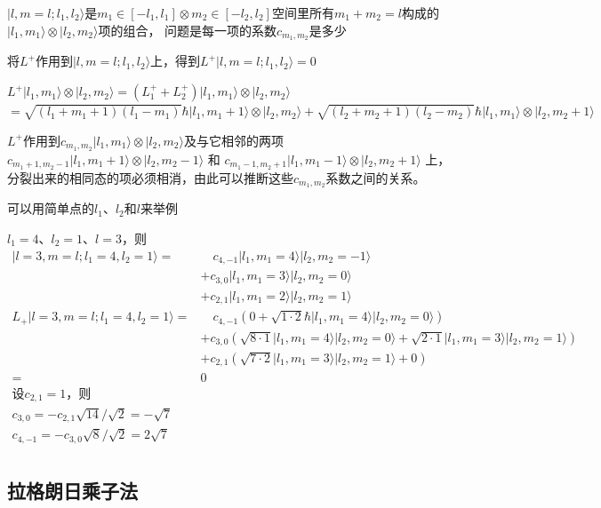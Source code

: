 $|l,m=l;l_1,l_2\rangle$是$m_1\in [-l_1,l_1]\otimes m_2\in[-l_2,l_2]$空间里所有$m_1+m_2=l$构成的$|l_1,m_1\rangle\otimes|l_2,m_2\rangle$项的组合，
问题是每一项的系数$c_{m_1,m_2}$是多少

将$L^{+}$作用到$|l,m=l;l_1,l_2\rangle$上，得到$L^{+}|l,m=l;l_1,l_2\rangle=0$

$L^{+}|l_1,m_1\rangle\otimes|l_2,m_2\rangle=(L_1^{+}+L_2^{+})|l_1,m_1\rangle\otimes|l_2,m_2\rangle$
$=\sqrt{(l_1+m_1+1)(l_1-m_1)}\hbar|l_1,m_1+1\rangle\otimes|l_2,m_2\rangle+\sqrt{(l_2+m_2+1)(l_2-m_2)}\hbar|l_1,m_1\rangle\otimes|l_2,m_2+1\rangle$

$L^{+}$作用到$c_{m_1,m_2}|l_1,m_1\rangle\otimes|l_2,m_2\rangle$及与它相邻的两项
$c_{m_1+1,m_2-1}|l_1,m_1+1\rangle\otimes|l_2,m_2-1\rangle$
和
$c_{m_1-1,m_2+1}|l_1,m_1-1\rangle\otimes|l_2,m_2+1\rangle$
上，
分裂出来的相同态的项必须相消，由此可以推断这些$c_{m_1,m_2}$系数之间的关系。

\bigskip

可以用简单点的$l_1$、$l_2$和$l$来举例

$l_1=4$、$l_2=1$、$l=3$，则
\begin{equation}
    \begin{split}
    |l=3,m=l;l_1=4,l_2=1\rangle=&\quad c_{4,-1}|l_1,m_1=4\rangle|l_2,m_2=-1\rangle\\
    &+c_{3,0}|l_1,m_1=3\rangle|l_2,m_2=0\rangle\\
    &+c_{2,1}|l_1,m_1=2\rangle|l_2,m_2=1\rangle\\
    L_{+}|l=3,m=l;l_1=4,l_2=1\rangle=&\quad 
    c_{4,-1}(0+\sqrt{1\cdot 2}\hbar |l_1,m_1=4\rangle|l_2,m_2=0\rangle)\\
    &+c_{3,0}(\sqrt{8\cdot 1}|l_1,m_1=4\rangle|l_2,m_2=0\rangle+\sqrt{2\cdot 1}|l_1,m_1=3\rangle|l_2,m_2=1\rangle)\\
    &+c_{2,1}(\sqrt{7\cdot 2}|l_1,m_1=3\rangle|l_2,m_2=1\rangle+0)\\
    =& 0\\
    \text{设}c_{2,1}=1\text{，则}\\
    c_{3,0}=-c_{2,1}\sqrt{14}/\sqrt{2}=-\sqrt{7}\\
    c_{4,-1}=-c_{3,0}\sqrt{8}/\sqrt{2}=2\sqrt{7}\\
    \end{split}
\end{equation}


\subsection{拉格朗日乘子法}

